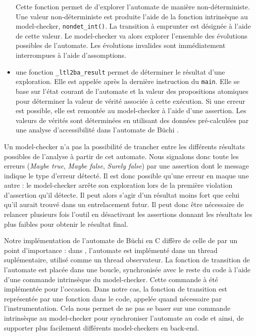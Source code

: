 \begin{itemize}
  Cette fonction permet de d'explorer l'automate de manière
  non-déterministe. Une valeur non-déterministe est produite l'aide de
  la fonction intrinsèque au model-checker, \lstinline!nondet_int()!. La
  transition à emprunter est désignée à l'aide de cette valeur. Le
  model-checker va alors explorer l'ensemble des évolutions possibles de
  l'automate. Les évolutions invalides sont immédiatement interrompues à
  l'aide d'assomptions.
\item
  une fonction \lstinline!_ltl2ba_result! permet de déterminer le
  résultat d'une exploration. Elle est appelée après la dernière
  instruction du \lstinline!main!. Elle se base sur l'état courant de
  l'automate et la valeur des propositions atomiques pour déterminer la
  valeur de vérité associée à cette exécution. Si une erreur est
  possible, elle est remontée au model-checker à l'aide d'une assertion.
  Les valeurs de vérités sont déterminées en utilisant des données
  pré-calculées par une analyse d'accessibilité dans l'automate de Büchi
  \cite{morse_ltl}.
\end{itemize}

Un model-checker n'a pas la possibilité de trancher entre les différents
résultats possibles de l'analyse à partir de cet automate. Nous
signalons donc toute les erreurs (\emph{Maybe true}, \emph{Maybe false},
\emph{Surely false}) par une assertion dont le message indique le type
d'erreur détecté. Il est donc possible qu'une erreur en maque une autre
: le model-checker arrête son exploration lors de la première violation
d'assertion qu'il détecte. Il peut alors s'agir d'un résultat moins fort
que celui qu'il aurait trouvé dans un entrelacement futur. Il peut donc
être nécessaire de relancer plusieurs fois l'outil en désactivant les
assertions donnant les résultats les plus faibles pour obtenir le
résultat final.

Notre implémentation de l'automate de Büchi en C diffère de celle de
\cite{morse_ltl} par un point d'importance : dans
\cite{morse_ltl}, l'automate est implémenté dans un thread
suplémentaire, utilisé comme un thread observateur. La fonction de
transition de l'automate est placée dans une boucle, synchronisée avec
le reste du code à l'aide d'une commande intrinsèque du model-checker.
Cette commande à été implémentée pour l'occasion. Dans notre cas, la
fonction de transition est représentée par une fonction dans le code,
appelée quand nécessaire par l'instrumentation. Cela nous permet de ne
pas se baser sur une commande intrinsèque au model-checker pour
synchroniser l'automate au code et ainsi, de supporter plus facilement
différents model-checkers en back-end.

